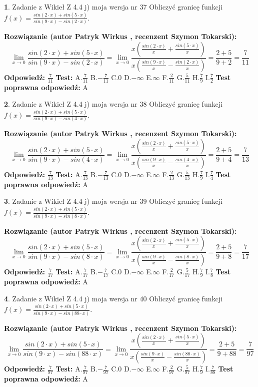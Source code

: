 \documentclass[12pt, a4paper]{article}
\theoremstyle{definition} %
\newtheorem{zad}{}
\newcommand{\zadStart}[1]{\begin{zad}#1\newline}
\newcommand{\zadStop}{\end{zad}}
\newcommand{\rozwStart}[2]{\noindent \textbf{Rozwiązanie (autor #1 , recenzent #2): }\newline}
\newcommand{\rozwStop}{\newline}
\newcommand{\odpStart}{\noindent \textbf{Odpowiedź:}\newline}
\newcommand{\odpStop}{\newline}
\newcommand{\testStart}{\noindent \textbf{Test:}\newline}
\newcommand{\testStop}{\newline}
\newcommand{\kluczStart}{\noindent \textbf{Test poprawna odpowiedź:}\newline}
\newcommand{\kluczStop}{\newline}
\begin{document}
\zadStart{Zadanie z Wikieł Z 4.4 j) moja wersja nr 37}
Obliczyć granicę funkcji $f(x)=\frac{sin(2\cdot x) +sin(5\cdot x)}{sin(9\cdot x) -sin(2\cdot x)}$.
\zadStop
\rozwStart{Patryk Wirkus}{Szymon Tokarski}
$$\lim\limits_{x\to 0}\frac{sin(2\cdot x) +sin(5\cdot x)}{sin(9\cdot x) -sin(2\cdot x)}=\lim\limits_{x\to 0}\frac{x(\frac{sin(2\cdot x)}{x}+\frac{sin(5\cdot x)}{x})}{x(\frac{sin(9\cdot x)}{x}-\frac{sin(2\cdot x)}{x})}=\frac{2+5}{9+2} = \frac{7}{11}$$
\rozwStop
\odpStart
$\frac{7}{11}$
\odpStop
\testStart
A.$\frac{7}{11}$
B.$-\frac{7}{11}$
C.$0$
D.$-\infty$
E.$\infty$
F.$\frac{2}{11}$
G.$\frac{5}{11}$
H.$\frac{7}{9}$
I.$\frac{7}{2}$
\testStop
\kluczStart
A
\kluczStop



\zadStart{Zadanie z Wikieł Z 4.4 j) moja wersja nr 38}
Obliczyć granicę funkcji $f(x)=\frac{sin(2\cdot x) +sin(5\cdot x)}{sin(9\cdot x) -sin(4\cdot x)}$.
\zadStop
\rozwStart{Patryk Wirkus}{Szymon Tokarski}
$$\lim\limits_{x\to 0}\frac{sin(2\cdot x) +sin(5\cdot x)}{sin(9\cdot x) -sin(4\cdot x)}=\lim\limits_{x\to 0}\frac{x(\frac{sin(2\cdot x)}{x}+\frac{sin(5\cdot x)}{x})}{x(\frac{sin(9\cdot x)}{x}-\frac{sin(4\cdot x)}{x})}=\frac{2+5}{9+4} = \frac{7}{13}$$
\rozwStop
\odpStart
$\frac{7}{13}$
\odpStop
\testStart
A.$\frac{7}{13}$
B.$-\frac{7}{13}$
C.$0$
D.$-\infty$
E.$\infty$
F.$\frac{2}{13}$
G.$\frac{5}{13}$
H.$\frac{7}{9}$
I.$\frac{7}{4}$
\testStop
\kluczStart
A
\kluczStop



\zadStart{Zadanie z Wikieł Z 4.4 j) moja wersja nr 39}
Obliczyć granicę funkcji $f(x)=\frac{sin(2\cdot x) +sin(5\cdot x)}{sin(9\cdot x) -sin(8\cdot x)}$.
\zadStop
\rozwStart{Patryk Wirkus}{Szymon Tokarski}
$$\lim\limits_{x\to 0}\frac{sin(2\cdot x) +sin(5\cdot x)}{sin(9\cdot x) -sin(8\cdot x)}=\lim\limits_{x\to 0}\frac{x(\frac{sin(2\cdot x)}{x}+\frac{sin(5\cdot x)}{x})}{x(\frac{sin(9\cdot x)}{x}-\frac{sin(8\cdot x)}{x})}=\frac{2+5}{9+8} = \frac{7}{17}$$
\rozwStop
\odpStart
$\frac{7}{17}$
\odpStop
\testStart
A.$\frac{7}{17}$
B.$-\frac{7}{17}$
C.$0$
D.$-\infty$
E.$\infty$
F.$\frac{2}{17}$
G.$\frac{5}{17}$
H.$\frac{7}{9}$
I.$\frac{7}{8}$
\testStop
\kluczStart
A
\kluczStop



\zadStart{Zadanie z Wikieł Z 4.4 j) moja wersja nr 40}
Obliczyć granicę funkcji $f(x)=\frac{sin(2\cdot x) +sin(5\cdot x)}{sin(9\cdot x) -sin(88\cdot x)}$.
\zadStop
\rozwStart{Patryk Wirkus}{Szymon Tokarski}
$$\lim\limits_{x\to 0}\frac{sin(2\cdot x) +sin(5\cdot x)}{sin(9\cdot x) -sin(88\cdot x)}=\lim\limits_{x\to 0}\frac{x(\frac{sin(2\cdot x)}{x}+\frac{sin(5\cdot x)}{x})}{x(\frac{sin(9\cdot x)}{x}-\frac{sin(88\cdot x)}{x})}=\frac{2+5}{9+88} = \frac{7}{97}$$
\rozwStop
\odpStart
$\frac{7}{97}$
\odpStop
\testStart
A.$\frac{7}{97}$
B.$-\frac{7}{97}$
C.$0$
D.$-\infty$
E.$\infty$
F.$\frac{2}{97}$
G.$\frac{5}{97}$
H.$\frac{7}{9}$
I.$\frac{7}{88}$
\testStop
\kluczStart
A
\kluczStop
\end{document}
